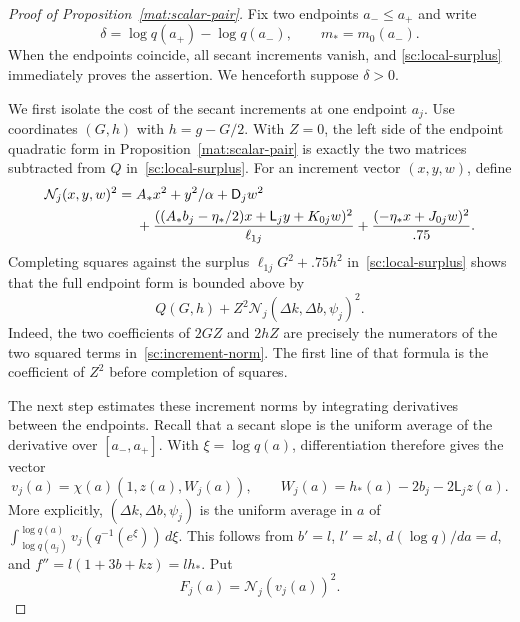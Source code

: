 \documentclass[11pt]{article}
\theoremstyle{definition}
\theoremstyle{remark}
\numberwithin{equation}{section}
\begin{document}
\begin{proof}[Proof of Proposition~\ref{mat:scalar-pair}]
Fix two endpoints $a_-\le a_+$ and write
\[
 \delta=\log q(a_+)-\log q(a_-),\qquad m_*=m_0(a_-).
\]
When the endpoints coincide, all secant increments vanish, and
\eqref{sc:local-surplus} immediately proves the assertion.
We henceforth suppose $\delta>0$.

We first isolate the cost of the secant increments at one endpoint $a_j$.
Use coordinates $(G,h)$ with $h=g-G/2$.  With $Z=0$, the left side of
the endpoint quadratic form in Proposition~\ref{mat:scalar-pair} is
exactly the two matrices subtracted from $Q$ in~\eqref{sc:local-surplus}.
For an increment vector $(x,y,w)$, define
\begin{align}
 \mathcal N_j(x,y,w)^2={}&A_*x^2+y^2/\alpha+\mathsf D_jw^2\notag\\
 &+\frac{((A_*b_j-\eta_*/2)x+\mathsf L_jy+K_{0j}w)^2}{\ell_{1j}}
   +\frac{(-\eta_*x+J_{0j}w)^2}{.75}.
 \label{sc:increment-norm}
\end{align}
Completing squares against the surplus
$\ell_{1j}G^2+.75h^2$ in~\eqref{sc:local-surplus} shows that the full
endpoint form is bounded above by
\begin{equation}\label{sc:one-endpoint}
 Q(G,h)+Z^2\mathcal N_j(\Delta k,\Delta b,\psi_j)^2.
\end{equation}
Indeed, the two coefficients of $2GZ$ and $2hZ$ are precisely the
numerators of the two squared terms in~\eqref{sc:increment-norm}.
The first line of that formula is the coefficient of $Z^2$ before
completion of squares.

The next step estimates these increment norms by integrating derivatives
between the endpoints.  Recall that a secant slope is the uniform average
of the derivative over $[a_-,a_+]$.  With $\xi=\log q(a)$, differentiation
therefore gives the vector
\begin{equation}\label{sc:derivative-vector}
 v_j(a)=\chi(a)(1,z(a),W_j(a)),\qquad
 W_j(a)=h_*(a)-2b_j-2\mathsf L_jz(a).
\end{equation}
More explicitly, $(\Delta k,\Delta b,\psi_j)$ is the uniform average in
$a$ of $\int_{\log q(a_j)}^{\log q(a)}v_j(q^{-1}(e^\xi))\,d\xi$.
This follows from $b'=l$, $l'=zl$, $d(\log q)/da=d$, and
$f''=l(1+3b+kz)=lh_*$.
Put
\[
 F_j(a)=\mathcal N_j(v_j(a))^2.
\]


\end{proof}
\end{document}
